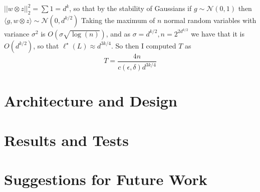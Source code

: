 $||w \otimes z||^2_2 = \sum 1 = d^k$, so that by the stability of Gaussians
if $g \sim \mathcal N(0, 1)$ then $\langle g, w \otimes z \rangle \sim \mathcal
N(0, d^{k/2})$
Taking the maximum of $n$ normal random variables with variance $\sigma^2$
is $O(\sigma \sqrt{\log(n)})$, and as $\sigma = d^{k/2}, n = 2^{2d^{k/2}}$ we
have that it is $O(d^{k/2})$, so that $\ell^\star(L) \approx d^{3k/4}$.
So then I computed $T$ as 
\[ T = \frac{4n}{c(\epsilon, \delta) d^{3k/4}} \]
\section{Architecture and Design}

\section{Results and Tests}

\section{Suggestions for Future Work}


